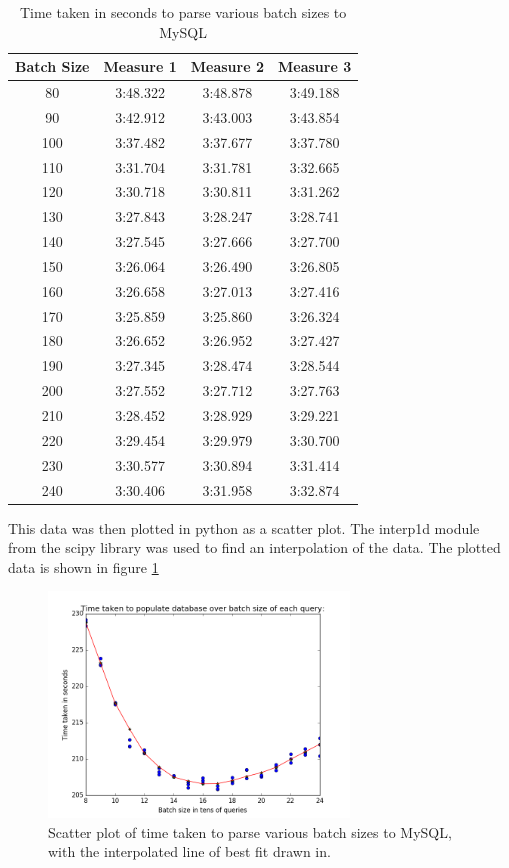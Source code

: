 \documentclass{article}
\begin{document}
\begin{table}[h!]
	\centering
	\begin{tabular}{||c c c c||}
		\hline
		Batch Size & Measure 1 & Measure 2 & Measure 3 \\ [0.5ex]
		\hline\hline
		80 & 3:48.322 & 3:48.878 & 3:49.188 \\ [0.5ex]
		\hline
		90 & 3:42.912 & 3:43.003 & 3:43.854 \\ [0.5ex]
		\hline
		100 & 3:37.482 & 3:37.677 & 3:37.780 \\ [0.5ex]
		\hline
		110 & 3:31.704 & 3:31.781 & 3:32.665 \\ [0.5ex]
		\hline
		120 & 3:30.718 & 3:30.811 & 3:31.262 \\ [0.5ex]
		\hline
		130 & 3:27.843 & 3:28.247 & 3:28.741 \\ [0.5ex]
		\hline
		140 & 3:27.545 & 3:27.666 & 3:27.700 \\ [0.5ex]
		\hline
		150 & 3:26.064 & 3:26.490 & 3:26.805 \\ [0.5ex]
		\hline
		160 & 3:26.658 & 3:27.013 & 3:27.416 \\ [0.5ex]
		\hline
		170 & 3:25.859 & 3:25.860 & 3:26.324 \\ [0.5ex]
		\hline
		180 & 3:26.652 & 3:26.952 & 3:27.427 \\ [0.5ex]
		\hline
		190 & 3:27.345 & 3:28.474 & 3:28.544 \\ [0.5ex]
		\hline
		200 & 3:27.552 & 3:27.712 & 3:27.763 \\ [0.5ex]
		\hline
		210 & 3:28.452 & 3:28.929 & 3:29.221 \\ [0.5ex]
		\hline
		220 & 3:29.454 & 3:29.979 & 3:30.700 \\ [0.5ex]
		\hline
		230 & 3:30.577 & 3:30.894 & 3:31.414 \\ [0.5ex]
		\hline
		240 & 3:30.406 & 3:31.958 & 3:32.874 \\ [0.5ex]
		\hline
	\end{tabular}
	\caption{Time taken in seconds to parse various batch sizes to MySQL}
	\label{table:1}
\end{table}

This data was then plotted in python as a scatter plot.  The interp1d module
from the scipy library was used to find an interpolation of the data.  The
plotted data is shown in figure \ref{figure:1}

\begin{figure}[h]
	\includegraphics[width=8cm]{graph_batch_interpolation}
	\caption{Scatter plot of time taken to parse various batch sizes to
	MySQL, with the interpolated line of best fit drawn in.}
	\label{figure:1}
\end{figure}
\end{document}
